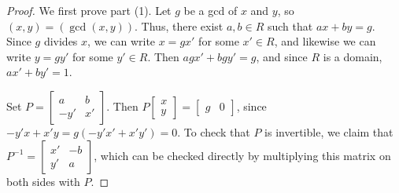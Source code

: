 \documentclass[12pt]{report}
\numberwithin{equation}{section}
\numberwithin{theorem}{chapter}
\theoremstyle{definition}
\newtheorem*{basic properties}{Basic Properties}
\newtheorem*{Important Remark}{Important Remark}
\begin{document}
\begin{proof}
We first prove part (1). Let $g$ be a gcd of $x$ and $y$, so $(x,y) = (\gcd(x,y))$. Thus, there exist $a, b \in R$ such that $ax+by = g$. 
Since $g$ divides $x$, we can write $x=g x'$ for some $x'\in R$, and likewise we can write $y=gy'$ for some $y'\in R$. Then $a g x' + b g y' = g$, and since $R$ is a domain, $a x' + b y' =1$.

Set $P= \begin{bmatrix} a & b \\ -y' & x' \end{bmatrix}$. Then $P \begin{bmatrix} x \\ y\end{bmatrix} = \begin{bmatrix} g & 0\end{bmatrix}$, since $-y' x + x' y = g(-y' x' + x' y') = 0$. To check that $P$ is invertible, we claim that $P^{-1} = \begin{bmatrix} x' & -b \\ y' & a\end{bmatrix}$, which can be checked directly by multiplying this matrix on both sides with $P$.



\end{proof}
\end{document}
